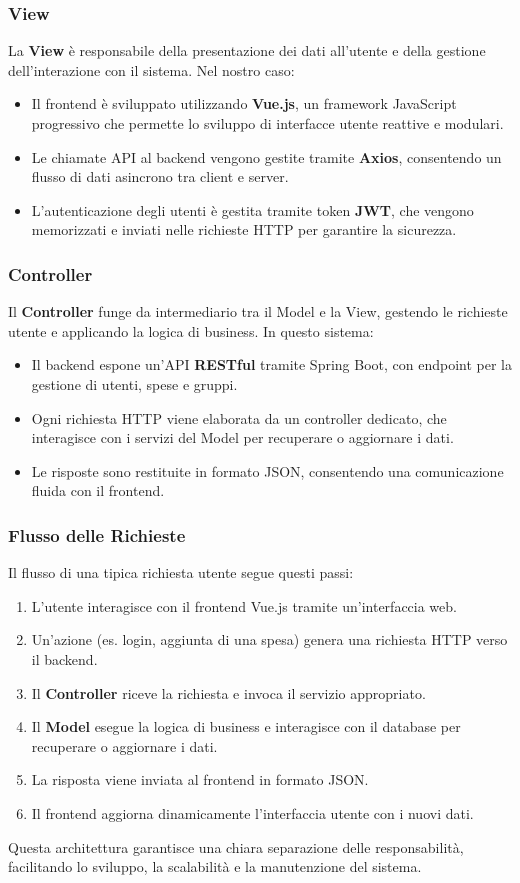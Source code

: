 \subsubsection{View}
La \textbf{View} è responsabile della presentazione dei dati all'utente e della gestione dell'interazione con il sistema. Nel nostro caso:
\begin{itemize}
    \item Il frontend è sviluppato utilizzando \textbf{Vue.js}, un framework JavaScript progressivo che permette lo sviluppo di interfacce utente reattive e modulari.
    \item Le chiamate API al backend vengono gestite tramite \textbf{Axios}, consentendo un flusso di dati asincrono tra client e server.
    \item L'autenticazione degli utenti è gestita tramite token \textbf{JWT}, che vengono memorizzati e inviati nelle richieste HTTP per garantire la sicurezza.
\end{itemize}

\subsubsection{Controller}
Il \textbf{Controller} funge da intermediario tra il Model e la View, gestendo le richieste utente e applicando la logica di business. In questo sistema:
\begin{itemize}
    \item Il backend espone un'API \textbf{RESTful} tramite Spring Boot, con endpoint per la gestione di utenti, spese e gruppi.
    \item Ogni richiesta HTTP viene elaborata da un controller dedicato, che interagisce con i servizi del Model per recuperare o aggiornare i dati.
    \item Le risposte sono restituite in formato JSON, consentendo una comunicazione fluida con il frontend.
\end{itemize}

\subsubsection{Flusso delle Richieste}
Il flusso di una tipica richiesta utente segue questi passi:
\begin{enumerate}
    \item L'utente interagisce con il frontend Vue.js tramite un'interfaccia web.
    \item Un'azione (es. login, aggiunta di una spesa) genera una richiesta HTTP verso il backend.
    \item Il \textbf{Controller} riceve la richiesta e invoca il servizio appropriato.
    \item Il \textbf{Model} esegue la logica di business e interagisce con il database per recuperare o aggiornare i dati.
    \item La risposta viene inviata al frontend in formato JSON.
    \item Il frontend aggiorna dinamicamente l'interfaccia utente con i nuovi dati.
\end{enumerate}

Questa architettura garantisce una chiara separazione delle responsabilità, facilitando lo sviluppo, la scalabilità e la manutenzione del sistema.


